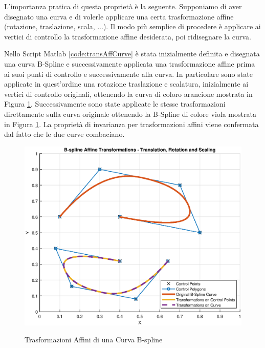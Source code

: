 \documentclass[a4paper, 12pt]{article}
\begin{document}
L'importanza pratica di questa proprietà è la seguente. Supponiamo di aver disegnato una curva e di volerle applicare una certa trasformazione affine (rotazione,
traslazione, scala, ...). Il modo più semplice di procedere è applicare ai vertici di controllo la trasformazione affine desiderata, poi ridisegnare la curva.



Nello Script Matlab \ref{code:transAffCurve} è stata inizialmente definita e disegnata una curva B-Spline e successivamente applicata una trasformazione affine prima ai suoi punti di controllo e successivamente alla curva. In particolare sono state applicate in quest'ordine una rotazione traslazione e scalatura, inizialmente ai vertici di controllo originali, ottenendo la curva di coloro arancione mostrata in Figura \ref{fig:transAffCurve}. Successivamente sono state applicate le stesse trasformazioni direttamente sulla curva originale ottenendo la B-Spline di colore viola mostrata in Figura \ref{fig:transAffCurve}. La proprietà di invarianza per trasformazioni affini viene confermata dal fatto che le due curve combaciano.

\begin{figure}[!]
	\centering
	\caption{Trasformazioni Affini di una Curva B-spline}
	\includegraphics[scale=0.55]{plot_curve_affine_trans.eps}
	\label{fig:transAffCurve}
\end{figure}
\end{document}
